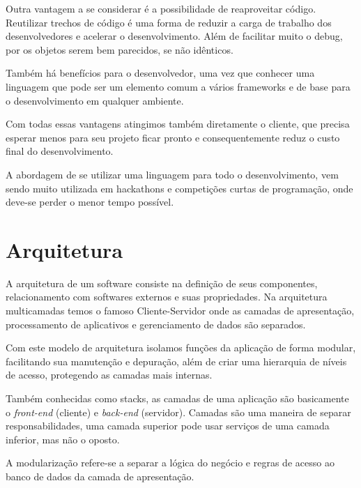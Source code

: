 \documentclass[
	12pt,				%
	openright,			%
	twoside,			%
	a4paper,			%
	english,			%
	brazil				%
	]{abntex2}
\begin{document}
Outra vantagem a se considerar é a possibilidade de reaproveitar código. Reutilizar trechos de código é uma forma de reduzir a carga de trabalho dos desenvolvedores e acelerar o desenvolvimento. Além de facilitar muito o debug, por os objetos serem bem parecidos, se não idênticos.

Também há benefícios para o desenvolvedor, uma vez que conhecer uma linguagem que pode ser um elemento comum a vários frameworks e de base para o desenvolvimento em qualquer ambiente.

Com todas essas vantagens atingimos também diretamente o cliente, que precisa esperar menos para seu projeto ficar pronto e consequentemente reduz o custo final do desenvolvimento.

A abordagem de se utilizar uma linguagem para todo o desenvolvimento, vem sendo muito utilizada em hackathons e competições curtas de programação, onde deve-se perder o menor tempo possível.

\section{Arquitetura}
\label{sec:Arquitetura}

A arquitetura de um software consiste na definição de seus componentes, relacionamento com softwares externos e suas propriedades. Na arquitetura multicamadas temos o famoso Cliente-Servidor onde as camadas de apresentação, processamento de aplicativos e gerenciamento de dados são separados.

Com este modelo de arquitetura isolamos funções da aplicação de forma modular, facilitando sua manutenção e depuração, além de criar uma hierarquia de níveis de acesso, protegendo as camadas mais internas.

Também conhecidas como stacks, as camadas de uma aplicação são basicamente o \textit{front-end} (cliente) e \textit{back-end} (servidor). Camadas são uma maneira de separar responsabilidades, uma camada superior pode usar serviços de uma camada inferior, mas não o oposto. 

A modularização refere-se a separar a lógica do negócio e regras de acesso ao banco de dados da camada de apresentação.
\end{document}
